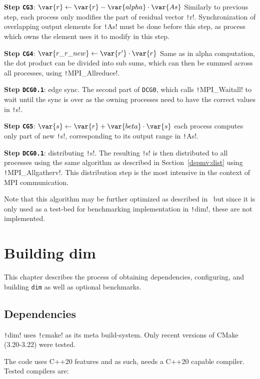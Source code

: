 \documentclass[thesis=M,english]{FITthesis}[2019/12/23]
\newcommand{\csre}[1]{\texttt!#1!}
\begin{document}
\textbf{Step \texttt{CG3}}: $\var{r} \gets \var{r} - \var{alpha} \cdot \var{As}$ Similarly to previous step, each process
only modifies the part of residual vector \csre{r}. Synchronization of overlapping
output elements for \csre{As} must be done before this step, as process which owns the
element uses it to modify  in this step.

\textbf{Step \texttt{CG4}}: $\var{r\_r\_new} \gets \var{r'} \cdot \var{r}$ Same as in alpha computation, the dot product
can be divided into sub sums, which can then be summed across all processes, using
\csre{MPI_Allreduce}.

\textbf{Step \texttt{DCG0.1}}: edge sync. The second part of \texttt{DCG0}, which calls \csre{MPI_Waitall}
to wait until the sync is over as the owning processes need to have the correct values in \csre{s}.

\textbf{Step \texttt{CG5}}: $\var{s} \gets \var{r} + \var{beta} \cdot \var{s}$ each process computes only part of new
\csre{s}, corresponding to its output range in \csre{As}.

\textbf{Step \texttt{DCG0.1}}: distributing \csre{s}. The resulting \csre{s} is
then distributed to all processes using the same algorithm as described in Section~\ref{dspmv:dist}
using \csre{MPI_Allgatherv}.
This distribution step is the most intensive in the context of MPI communication.

Note that this algorithm may be further optimized as described in~\cite{distCGwRedSync} but
since it is only used as a test-bed for benchmarking implementation in \csre{dim}, these are not
implemented.

\chapter{Building dim}

This chapter describes the process of obtaining dependencies, configuring, and building \texttt{dim} as well
as optional benchmarks.

\section{Dependencies}\label{bdim:deps}

\csre{dim} uses \csre{cmake} as its meta build-system. Only recent versions of CMake (3.20-3.22) were tested.

The code uses C++20 features and as such, needs a C++20 capable compiler. Tested compilers
are:
\end{document}
